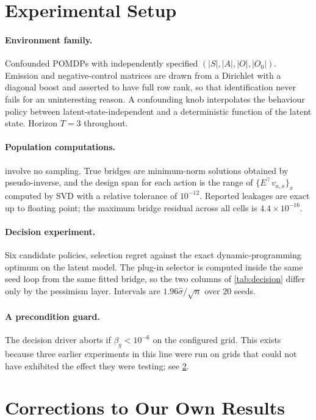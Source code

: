 \section{Experimental Setup}
\label{app:setup}

\paragraph{Environment family.} Confounded POMDPs with independently specified
$(|S|,|A|,|O|,|O_0|)$. Emission and negative-control matrices are drawn from a
Dirichlet with a diagonal boost and asserted to have full row rank, so that
identification never fails for an uninteresting reason. A confounding knob
interpolates the behaviour policy between latent-state-independent and a
deterministic function of the latent state. Horizon $T=3$ throughout.

\paragraph{Population computations.}  involve no
sampling. True bridges are minimum-norm solutions obtained by pseudo-inverse, and
the design span for each action is the range of $\{E^\top v_{a,x}\}_x$ computed by
SVD with a relative tolerance of $10^{-12}$. Reported leakages are exact up to
floating point; the maximum bridge residual across all cells is
$4.4\times10^{-16}$.

\paragraph{Decision experiment.} Six candidate policies, selection regret against
the exact dynamic-programming optimum on the latent model. The plug-in selector is
computed inside the same seed loop from the same fitted bridge, so the two columns
of \cref{tab:decision} differ only by the pessimism layer. Intervals are
$1.96\hat\sigma/\sqrt{n}$ over $20$ seeds.

\paragraph{A precondition guard.} The decision driver aborts if $\beta_g < 10^{-6}$
on the configured grid. This exists because three earlier experiments in this line
were run on grids that could not have exhibited the effect they were testing;
see \cref{app:corrections}.

\section{Corrections to Our Own Results}
\label{app:corrections}

